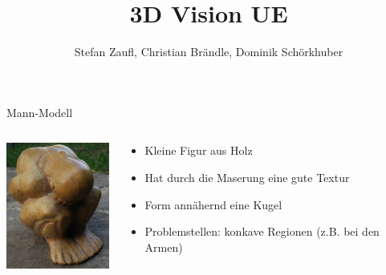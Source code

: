 \documentclass[11pt]{beamer}
\author{Stefan Zaufl, Christian Brändle, Dominik Schörkhuber}
\title{3D Vision UE}
\begin{document}
\begin{frame}
\titlepage
\end{frame}


\begin{frame}{Mann-Modell}
	\begin{columns}
		\includegraphics[width=3.5cm]{images/Mann_Original.jpg}
		\begin{block}{}
			\begin{itemize}
			\item Kleine Figur aus Holz
			\item Hat durch die Maserung eine gute Textur
			\item Form annähernd eine Kugel
			\item Problemstellen: konkave Regionen (z.B. bei den Armen) 
			\end{itemize}
		\end{block}
	\end{columns}
\end{frame}
\end{document}
